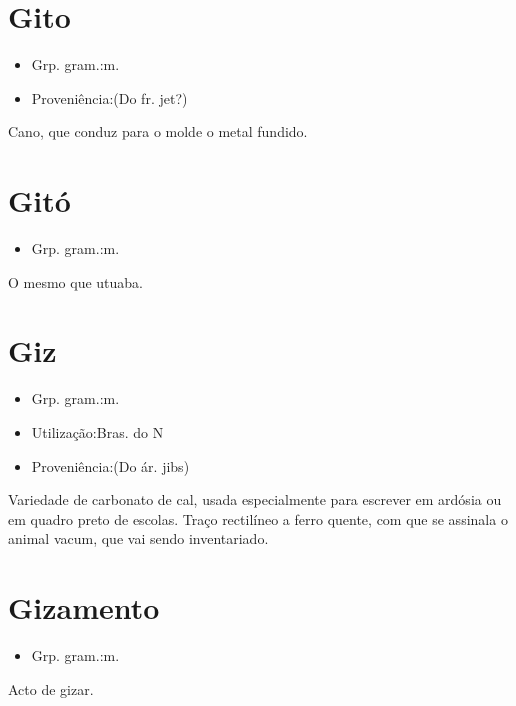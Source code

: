 \section{Gito}
\begin{itemize}
\item {Grp. gram.:m.}
\end{itemize}
\begin{itemize}
\item {Proveniência:(Do fr. \textunderscore jet\textunderscore ?)}
\end{itemize}
Cano, que conduz para o molde o metal fundido.
\section{Gitó}
\begin{itemize}
\item {Grp. gram.:m.}
\end{itemize}
O mesmo que \textunderscore utuaba\textunderscore .
\section{Giz}
\begin{itemize}
\item {Grp. gram.:m.}
\end{itemize}
\begin{itemize}
\item {Utilização:Bras. do N}
\end{itemize}
\begin{itemize}
\item {Proveniência:(Do ár. \textunderscore jibs\textunderscore )}
\end{itemize}
Variedade de carbonato de cal, usada especialmente para escrever em ardósia ou em quadro preto de escolas.
Traço rectilíneo a ferro quente, com que se assinala o animal vacum, que vai sendo inventariado.
\section{Gizamento}
\begin{itemize}
\item {Grp. gram.:m.}
\end{itemize}
Acto de gizar.
